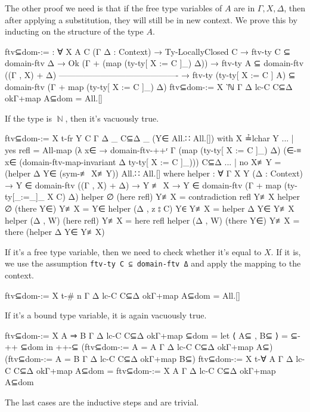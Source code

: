 \documentclass[logo,bsc,singlespacing,parskip,online]{infthesis}
\DeclareMathOperator{\nat}{\mathbb{N}}
\begin{document}
The other proof we need is that if the free type variables of $A$ are in $\Gamma, X, \Delta$, then
after applying a substitution, they will still be in new context. We prove this by inducting on the
structure of the type $A$.
\begin{code}
  ftv⊆dom-:= : ∀ {X A C} (Γ Δ : Context)
     → Ty-LocallyClosed C
     → ftv-ty C ⊆ domain-ftv Δ
     → Ok (Γ + (map (ty-ty[ X := C ]_) Δ))
     → ftv-ty A ⊆ domain-ftv ((Γ , X) + Δ)
       -------------------------------------------
     → ftv-ty (ty-ty[ X := C ] A)
         ⊆ domain-ftv (Γ + map (ty-ty[ X := C ]_) Δ)
  ftv⊆dom-:= {X} {‵ℕ} Γ Δ lc-C C⊆Δ okΓ+map A⊆dom = All.[]
\end{code}
If the type is $\nat$, then it's vacuously true.
\begin{code}
  ftv⊆dom-:= {X} {t-fr Y} {C} Γ Δ _ C⊆Δ _ (Y∈ All.∷ All.[])
    with X ≟lchar Y
  ... | yes refl = All-map
    (λ x∈ → domain-ftv-++ʳ Γ (map (ty-ty[ X := C ]_) Δ)
      (∈-≡ x∈ (domain-ftv-map-invariant {Δ} {ty-ty[ X := C ]_})))
    C⊆Δ
  ... | no  X≢Y  = (helper Δ Y∈ (sym-≢ X≢Y)) All.∷ All.[]
    where
      helper : ∀ {Γ X Y} (Δ : Context)
        → Y ∈ domain-ftv ((Γ , X) + Δ)
        → Y ≢ X
        → Y ∈ domain-ftv (Γ + map (ty-ty[_:=_]_ X C) Δ)
      helper ∅ (here refl) Y≢X = contradiction refl Y≢X
      helper ∅ (there Y∈) Y≢X = Y∈
      helper (Δ , z ⦂ C) Y∈ Y≢X = helper Δ Y∈ Y≢X
      helper (Δ , W) (here refl) Y≢X = here refl
      helper (Δ , W) (there Y∈) Y≢X = there (helper Δ Y∈ Y≢X)
\end{code}
If it's a free type variable, then we need to check whether it's equal to $X$. If it is, we use the
assumption \texttt{ftv-ty C ⊆ domain-ftv Δ} and apply the mapping to the context.
\begin{code}
  ftv⊆dom-:= {X} {t-# n} Γ Δ lc-C C⊆Δ okΓ+map A⊆dom = All.[]
\end{code}
If it's a bound type variable, it is again vacuously true.
\begin{code}
  ftv⊆dom-:= {X} {A ⇒ B} Γ Δ lc-C C⊆Δ okΓ+map ⊆dom =
    let ⟨ A⊆ , B⊆ ⟩ = ⊆-++ ⊆dom
    in ++-⊆
      (ftv⊆dom-:= {A = A} Γ Δ lc-C C⊆Δ okΓ+map A⊆)
      (ftv⊆dom-:= {A = B} Γ Δ lc-C C⊆Δ okΓ+map B⊆)
  ftv⊆dom-:= {X} {t-∀ A} Γ Δ lc-C C⊆Δ okΓ+map A⊆dom =
    ftv⊆dom-:= {X} {A} Γ Δ lc-C C⊆Δ okΓ+map A⊆dom
\end{code}
The last cases are the inductive steps and are trivial.
\end{document}
